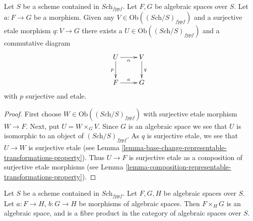 \begin{lemma}
\label{lemma-lift-morphism-presentations}
Let $S$ be a scheme contained in $\textit{Sch}_{fppf}$.
Let $F, G$ be algebraic spaces over $S$.
Let $a : F \to G$ be a morphism.
Given any $V \in \text{Ob}((\textit{Sch}/S)_{fppf})$
and a surjective etale morphism $q : V \to G$ there exists
a $U \in \text{Ob}((\textit{Sch}/S)_{fppf})$
and a commutative diagram
$$
\xymatrix{
U \ar[d]_p \ar[r]_\alpha &
V \ar[d]^q \\
F \ar[r]^a & G
}
$$
with $p$ surjective and etale.
\end{lemma}

\begin{proof}
First choose $W \in \text{Ob}((\textit{Sch}/S)_{fppf})$
with surjective etale morphism $W \to F$.
Next, put $U = W \times_G V$. Since $G$ is an algebraic space
we see that $U$ is isomorphic to an object of $(\textit{Sch}/S)_{fppf}$.
As $q$ is surjective etale, we see that $U \to W$ is surjective
etale (see
Lemma \ref{lemma-base-change-representable-transformations-property}).
Thus $U \to F$ is surjective etale as a composition of surjective
etale morphisms (see
Lemma \ref{lemma-composition-representable-transformations-property}).
\end{proof}

\begin{lemma}
\label{lemma-fibre-product-spaces}
Let $S$ be a scheme contained in $\textit{Sch}_{fppf}$.
Let $F, G, H$ be algebraic spaces over $S$.
Let $a : F \to H$, $b : G \to H$ be morphisms of algebraic spaces.
Then $F \times_H G$ is an algebraic space, and is a fibre product
in the category of algebraic spaces over $S$.
\end{lemma}

